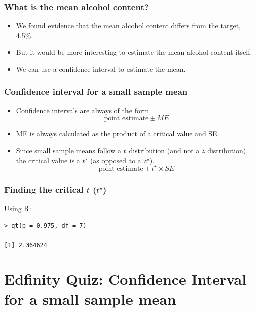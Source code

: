 \documentclass[slidestop,compress,mathserif]{beamer}
\begin{document}


\begin{frame}
\frametitle{What is the mean alcohol content?}

\begin{itemize}
\item We found evidence that the mean alcohol content differs from the target, 4.5\%.
\pause
\item But it would be more interesting to estimate the mean alcohol content itself.
\pause
\item We can use a confidence interval to estimate the mean.
\end{itemize}
\end{frame}



\begin{frame}
\frametitle{Confidence interval for a small sample mean}

\begin{itemize}
\item Confidence intervals are always of the form
\[ \text{point estimate} \pm {ME} \]
\pause
\item ME is always calculated as the product of a critical value and SE.
\pause
\item Since small sample means follow a $t$ distribution (and not a $z$ distribution), the critical value is a $t^\star$ (as opposed to a $z^\star$).
\[ \text{point estimate} \pm t^{\star} \times SE \]
\end{itemize}
\end{frame}



\begin{frame}[fragile]
\frametitle{Finding the critical $t$ ($t^\star$)}

Using R:
\begin{verbatim}
> qt(p = 0.975, df = 7)

[1] 2.364624
\end{verbatim}
\end{frame}


\section{Edfinity Quiz: Confidence Interval for a small sample mean}

\end{document}
